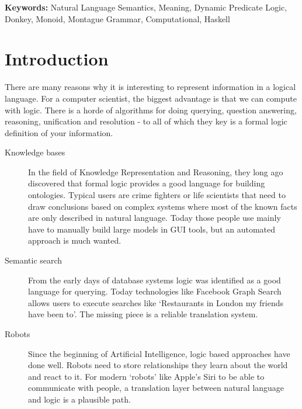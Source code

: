 \documentclass[12pt]{article}
\let\stdsection\section
\renewcommand\section{\newpage\stdsection}
\begin{document}
\smallskip\smallskip
\noindent \small{\textbf{Keywords:} Natural Language Semantics, Meaning, Dynamic Predicate Logic, Donkey, Monoid, Montague Grammar, Computational, Haskell}

\tableofcontents


\section{Introduction}



There are many reasons why it is interesting to represent information in a logical language. For a computer scientist, the biggest advantage is that we can compute with logic. There is a horde of algorithms for doing querying, question answering, reasoning, unification and resolution - to all of which they key is a formal logic definition of your information.

\begin{description}
\item[Knowledge bases] In the field of Knowledge Representation and Reasoning, they long ago discovered that formal logic provides a good language for building ontologies. Typical users are crime fighters or life scientists that need to draw conclusions based on complex systems\cite{malone2010modeling} where most of the known facts are only described in natural language. Today those people use mainly have to manually build large models in GUI tools, but an automated approach is much wanted.

\item[Semantic search] From the early days of database systems logic was identified\cite{fagin1995reasoning} as a good language for querying. Today technologies like Facebook Graph Search allows users to execute searches like `Restaurants in London my friends have been to'. The missing piece is a reliable translation system.

\item[Robots] Since the beginning of Artificial Intelligence, logic based approaches have done well.\cite{russell2010artificial} Robots need to store relationships they learn about the world and react to it. For modern `robots' like Apple's Siri to be able to communicate with people, a translation layer between natural language and logic is a plausible path.
\end{description}
\end{document}
